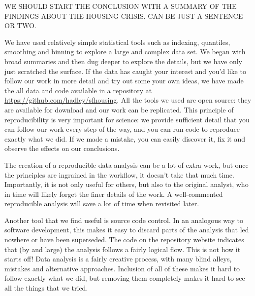 \documentclass[oneside]{article}
\begin{document}
WE SHOULD START THE CONCLUSION WITH A SUMMARY OF THE FINDINGS ABOUT THE HOUSING CRISIS. CAN BE JUST A SENTENCE OR TWO.

We have used relatively simple statistical tools such as indexing, quantiles, smoothing and binning to explore a large and complex data set.  We began with broad summaries and then dug deeper to explore the details, but we have only just scratched the surface.  If the data has caught your interest and you'd like to follow our work in more detail and try out some your own ideas, we have made the all data and code available in a repository at \url{https://github.com/hadley/sfhousing}.  All the tools we used are open source: they are available for download and our work can be replicated. This principle of reproducibility \citep{gentleman:2007} is very important for science: we provide sufficient detail that you can follow our work every step of the way, and you can run code to reproduce exactly what we did.  If we made a mistake, you can easily discover it, fix it and observe the effects on our conclusions.  

The creation of a reproducible data analysis can be a lot of extra work, but once the principles are ingrained in the workflow, it doesn't take that much time.  Importantly, it is not only useful for others, but also to the original analyst, who in time will likely forget the finer details of the work. A well-commented reproducible analysis will save a lot of time when revisited later.

Another tool that we find useful is source code control.  In an analogous way to software development, this makes it easy to discard parts of the analysis that led nowhere or have been superseded.  The code on the repository website indicates that (by and large) the analysis follows a fairly logical flow.  This is not how it starts off!  Data analysis is a fairly creative process, with many blind alleys, mistakes and alternative approaches.  Inclusion of all of these makes it hard to follow exactly what we did, but removing them completely makes it hard to see all the things that we tried.  
\end{document}
